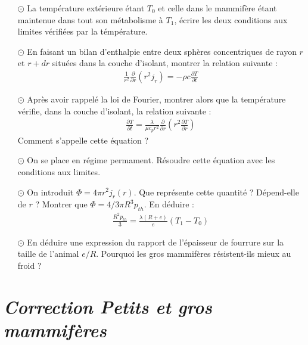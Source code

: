 \documentclass{report}
\begin{document}
\begin{itemize}

	\item[$\odot$] La température extérieure étant $T_{0}$ et celle dans le mammifère étant maintenue dans tout son métabolisme à $T_1$, écrire les deux conditions aux limites vérifiées par la témpérature.
	
	\item[$\odot$] En faisant un bilan d'enthalpie entre deux sphères concentriques de rayon $r$ et $r+dr$ situées dans la couche d'isolant, montrer la relation suivante :
	\begin{align*}
		\frac{1}{r^2}\frac{\partial }{\partial r}\left( r^2j_r\right) =-\rho c\frac{\partial T}{\partial t}
	\end{align*}
	
	\item[$\odot$] Après avoir rappelé la loi de Fourier, montrer alors que la température vérifie, dans la couche d'isolant, la relation suivante :
	\begin{align*}
		\frac{\partial T}{\partial t}=\frac{\lambda}{\mu c_p r^2}\frac{\partial }{\partial r}\left( r^2\frac{\partial T}{\partial r}\right) 	
	\end{align*}
	Comment s'appelle cette équation ?

	\item[$\odot$] On se place en régime permament. Résoudre cette équation avec les conditions aux limites.
	
	\item[$\odot$] On introduit $\Phi=4\pi r^2j_r(r)$. Que représente cette quantité ? Dépend-elle de $r$ ? Montrer que $\Phi=4/3\pi R^3p_{th}$. En déduire :
	\begin{align*}
		\frac{R^2p_{th}}{3}=\frac{\lambda (R+e)}{e}(T_1-T_0)
	\end{align*}
	
	\item[$\odot$] En déduire une expression du rapport de l'épaisseur de fourrure sur la taille de l'animal $e/R$. Pourquoi les gros mammifères résistent-ils mieux au froid ?

\end{itemize}

\newpage

\section*{\textit{Correction Petits et gros mammifères}}
\end{document}
